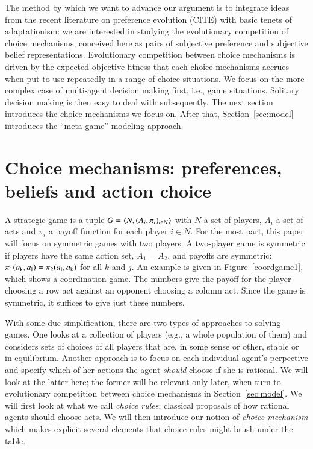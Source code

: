 \documentclass[fleqn,reqno,11pt]{article}
\begin{document}
The method by which we want to advance our argument is to integrate ideas from the recent
literature on preference evolution (CITE) with basic tenets of adaptationism: we are interested
in studying the evolutionary competition of choice mechanisms, conceived here as pairs of
subjective preference and subjective belief representations. Evolutionary competition between
choice mechanisms is driven by the expected objective fitness that each choice mechanisms
accrues when put to use repeatedly in a range of choice situations. We focus on the more
complex case of multi-agent decision making first, i.e., game situations. Solitary decision
making is then easy to deal with subsequently. The next section introduces the choice
mechanisms we focus on. After that, Section~\ref{sec:model} introduces the ``meta-game''
modeling approach.


\section{Choice mechanisms: preferences, beliefs and action choice}
\label{sec:basic-notions}

A strategic game is a tuple $ G=\left \langle  N, (A_i , \pi_i)_{i \in N} \right\rangle$ with $N$ a set of
players, $A_i$ a set of acts and $\pi_i$ a payoff function for each player $i \in N$. For the
most part, this paper will focus on symmetric games with two players. A two-player game is
symmetric if players have the same action set, $A_1 = A_2$, and payoffs are symmetric:
$\pi_1(a_{\text{k}}, a_{\text{l}}) = \pi_2(a_{\text{l}}, a_{\text{k}})$ for all $k$ and $j$. An example is
given in Figure~\ref{coordgame1}, which shows a coordination game. The numbers give the payoff
for the player choosing a row act against an opponent choosing a column act. Since the game is
symmetric, it suffices to give just these numbers.

With some due simplification, there are two types of approaches to solving games. One looks at
a collection of players (e.g., a whole population of them) and considers sets of choices of all
players that are, in some sense or other, stable or in equilibrium. Another approach is to
focus on each individual agent's perpective and specify which of her actions the agent
\emph{should} choose if she is rational. We will look at the latter here; the former will be
relevant only later, when turn to evolutionary competition between choice mechanisms in
Section~\ref{sec:model}. We will first look at what we call \emph{choice rules}: classical
proposals of how rational agents should choose acts. We will then introduce our notion of
\emph{choice mechanism} which makes explicit several elements that choice rules might brush
under the table.
\end{document}
